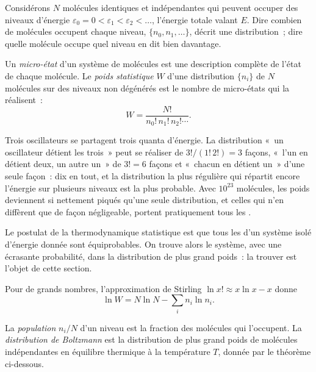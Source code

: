 Considérons $N$ molécules identiques et indépendantes qui peuvent occuper
des niveaux d'énergie
$\varepsilon_0 = 0 < \varepsilon_1 < \varepsilon_2 < \dots$, l'énergie
totale valant $E$. Dire combien de molécules occupent chaque niveau,
$\{n_0, n_1, \dots\}$, décrit une distribution~; dire quelle molécule
occupe quel niveau en dit bien davantage.

\begin{definition}\label{def:b3:partition-functions:microstate}
Un \emph{micro-état} d'un système de
molécules est une description complète de l'état de chaque molécule. Le
\emph{poids statistique} $W$ d'une distribution
$\{n_i\}$ de $N$ molécules sur des niveaux non dégénérés est le nombre de
micro-états qui la réalisent~:
\[
  W = \frac{N!}{n_0!\,n_1!\,n_2!\cdots}.
\]
\end{definition}

\begin{example}\label{ex:b3:partition-functions:three-quanta}
Trois oscillateurs se partagent trois quanta d'énergie. La distribution
«~un oscillateur détient les trois~» peut se réaliser de
$3!/(1!\,2!) = 3$ façons, «~l'un en détient deux, un autre un~» de
$3! = 6$ façons et «~chacun en détient un~» d'une seule façon~: dix
 en tout, et la distribution la plus régulière qui répartit
encore l'énergie sur plusieurs niveaux est la plus probable. Avec
$10^{23}$ molécules, les poids deviennent si nettement piqués qu'une
seule distribution, et celles qui n'en diffèrent que de façon
négligeable, portent pratiquement tous les .
\end{example}

\begin{remark}
Le postulat de la thermodynamique statistique est que tous les
 d'un système isolé d'énergie donnée sont équiprobables. On
trouve alors le système, avec une écrasante probabilité, dans la
distribution de plus grand poids~: la trouver est l'objet de cette
section.
\end{remark}

Pour de grands nombres, l'approximation de Stirling $\ln x! \approx x\ln x - x$ donne
\[
  \ln W = N\ln N - \sum_i n_i\ln n_i .
\]

\begin{definition}\label{def:b3:partition-functions:boltzmann}
La \emph{population} $n_i/N$ d'un niveau est la fraction
des molécules qui l'occupent. La \emph{distribution de Boltzmann}
est la distribution de plus grand poids de molécules indépendantes en
équilibre thermique à la température $T$, donnée par le théorème
ci-dessous.
\end{definition}


